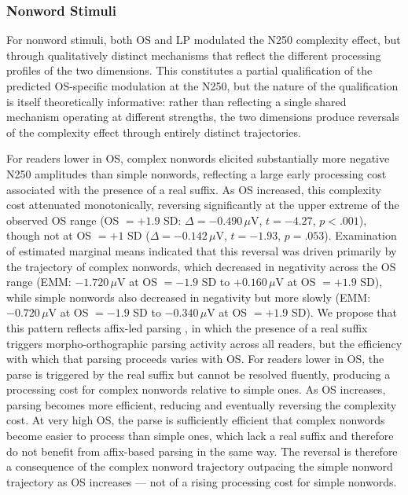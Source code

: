 \subsubsection{Nonword Stimuli}

For nonword stimuli, both OS and LP modulated the N250 complexity 
effect, but through qualitatively distinct mechanisms that reflect the 
different processing profiles of the two dimensions. This constitutes 
a partial qualification of the predicted OS-specific modulation at the 
N250, but the nature of the qualification is itself theoretically 
informative: rather than reflecting a single shared mechanism operating 
at different strengths, the two dimensions produce reversals of the 
complexity effect through entirely distinct trajectories.

For readers lower in OS, complex nonwords elicited substantially more 
negative N250 amplitudes than simple nonwords, reflecting a large early 
processing cost associated with the presence of a real suffix. As OS 
increased, this complexity cost attenuated monotonically, reversing 
significantly at the upper extreme of the observed OS range (OS $= 
+1.9$ SD: $\Delta = -0.490\,\mu$V, $t = -4.27$, $p < .001$), though 
not at OS $= +1$ SD ($\Delta = -0.142\,\mu$V, $t = -1.93$, $p = 
.053$). Examination of estimated marginal means indicated that this 
reversal was driven primarily by the trajectory of complex nonwords, 
which decreased in negativity across the OS range (EMM: $-1.720\,\mu$V 
at OS $= -1.9$ SD to $+0.160\,\mu$V at OS $= +1.9$ SD), while simple 
nonwords also decreased in negativity but more slowly (EMM: 
$-0.720\,\mu$V at OS $= -1.9$ SD to $-0.340\,\mu$V at OS $= +1.9$ 
SD). We propose that this pattern reflects affix-led parsing 
\citep{taft_lexical_1975, rastleMorphologicalDecompositionBased2008}, 
in which the presence of a real suffix triggers morpho-orthographic 
parsing activity across all readers, but the efficiency with which 
that parsing proceeds varies with OS. For readers lower in OS, the 
parse is triggered by the real suffix but cannot be resolved fluently, 
producing a processing cost for complex nonwords relative to simple 
ones. As OS increases, parsing becomes more efficient, reducing and 
eventually reversing the complexity cost. At very high OS, the parse 
is sufficiently efficient that complex nonwords become easier to 
process than simple ones, which lack a real suffix and therefore do 
not benefit from affix-based parsing in the same way. The reversal is 
therefore a consequence of the complex nonword trajectory outpacing 
the simple nonword trajectory as OS increases --- not of a rising 
processing cost for simple nonwords.

